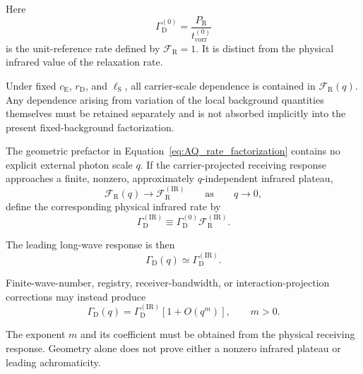 Here
\begin{equation}
    \Gamma_{\mathrm D}^{(0)}
    =
    \frac{
        P_{\mathrm R}
    }{
        t_{\mathrm{corr}}^{(0)}
    }
\end{equation}
is the unit-reference rate defined by
\(\mathcal F_{\mathrm R}=1\).
It is distinct from the physical infrared value of the relaxation rate.

Under fixed
\(c_{\mathrm E}\),
\(r_{\mathrm D}\),
and
\(\ell_{\mathrm S}\),
all carrier-scale dependence is contained in
\(\mathcal F_{\mathrm R}(q)\).
Any dependence arising from variation of the local background quantities
themselves must be retained separately and is not absorbed implicitly into
the present fixed-background factorization.

The geometric prefactor in
Equation~\eqref{eq:AQ_rate_factorization}
contains no explicit external photon scale \(q\).
If the carrier-projected receiving response approaches a finite,
nonzero, approximately \(q\)-independent infrared plateau,
\begin{equation}
    \mathcal F_{\mathrm R}(q)
    \longrightarrow
    \mathcal F_{\mathrm R}^{(\mathrm{IR})}
    \qquad
    \text{as}
    \qquad
    q\longrightarrow0,
\end{equation}
define the corresponding physical infrared rate by
\begin{equation}
    \Gamma_{\mathrm D}^{(\mathrm{IR})}
    \equiv
    \Gamma_{\mathrm D}^{(0)}
    \mathcal F_{\mathrm R}^{(\mathrm{IR})}.
\end{equation}

The leading long-wave response is then
\begin{equation}
    \boxed{
    \Gamma_{\mathrm D}(q)
    \simeq
    \Gamma_{\mathrm D}^{(\mathrm{IR})}.
    }
    \label{eq:AQ_achromatic_leading}
\end{equation}

Finite-wave-number, registry, receiver-bandwidth, or interaction-projection
corrections may instead produce
\begin{equation}
    \Gamma_{\mathrm D}(q)
    =
    \Gamma_{\mathrm D}^{(\mathrm{IR})}
    \left[
        1
        +
        O(q^m)
    \right],
    \qquad
    m>0.
    \label{eq:AQ_chromatic_correction}
\end{equation}

The exponent \(m\) and its coefficient must be obtained from the physical
receiving response. Geometry alone does not prove either a nonzero infrared
plateau or leading achromaticity.

